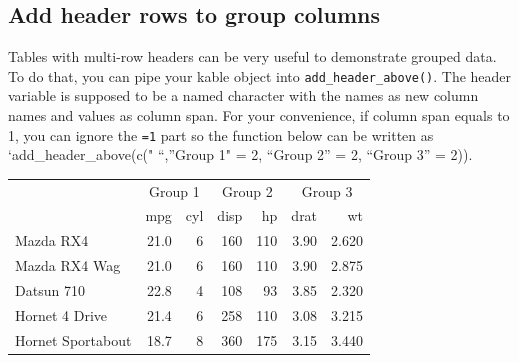 \documentclass[table]{article}
\newenvironment{Shaded}{\begin{snugshade}}{\end{snugshade}}
\newcommand{\DataTypeTok}[1]{\textcolor[rgb]{0.13,0.29,0.53}{#1}}
\newcommand{\DecValTok}[1]{\textcolor[rgb]{0.00,0.00,0.81}{#1}}
\newcommand{\KeywordTok}[1]{\textcolor[rgb]{0.13,0.29,0.53}{\textbf{#1}}}
\newcommand{\NormalTok}[1]{#1}
\newcommand{\OperatorTok}[1]{\textcolor[rgb]{0.81,0.36,0.00}{\textbf{#1}}}
\newcommand{\StringTok}[1]{\textcolor[rgb]{0.31,0.60,0.02}{#1}}
\begin{document}
\hypertarget{add-header-rows-to-group-columns}{%
\subsection{Add header rows to group
columns}\label{add-header-rows-to-group-columns}}

Tables with multi-row headers can be very useful to demonstrate grouped
data. To do that, you can pipe your kable object into
\texttt{add\_header\_above()}. The header variable is supposed to be a
named character with the names as new column names and values as column
span. For your convenience, if column span equals to 1, you can ignore
the \texttt{=1} part so the function below can be written as
`add\_header\_above(c(" ``,''Group 1" = 2, ``Group 2'' = 2, ``Group 3''
= 2)).

\begin{Shaded}
\end{Shaded}

\begin{table}[H]
\centering
\begin{tabular}{lrrrrrr}
\toprule
\multicolumn{1}{c}{ } & \multicolumn{2}{c}{Group 1} & \multicolumn{2}{c}{Group 2} & \multicolumn{2}{c}{Group 3} \\
\cmidrule(l{3pt}r{3pt}){2-3} \cmidrule(l{3pt}r{3pt}){4-5} \cmidrule(l{3pt}r{3pt}){6-7}
  & mpg & cyl & disp & hp & drat & wt\\
\midrule
Mazda RX4 & 21.0 & 6 & 160 & 110 & 3.90 & 2.620\\
Mazda RX4 Wag & 21.0 & 6 & 160 & 110 & 3.90 & 2.875\\
Datsun 710 & 22.8 & 4 & 108 & 93 & 3.85 & 2.320\\
Hornet 4 Drive & 21.4 & 6 & 258 & 110 & 3.08 & 3.215\\
Hornet Sportabout & 18.7 & 8 & 360 & 175 & 3.15 & 3.440\\
\bottomrule
\end{tabular}
\end{table}
\end{document}
